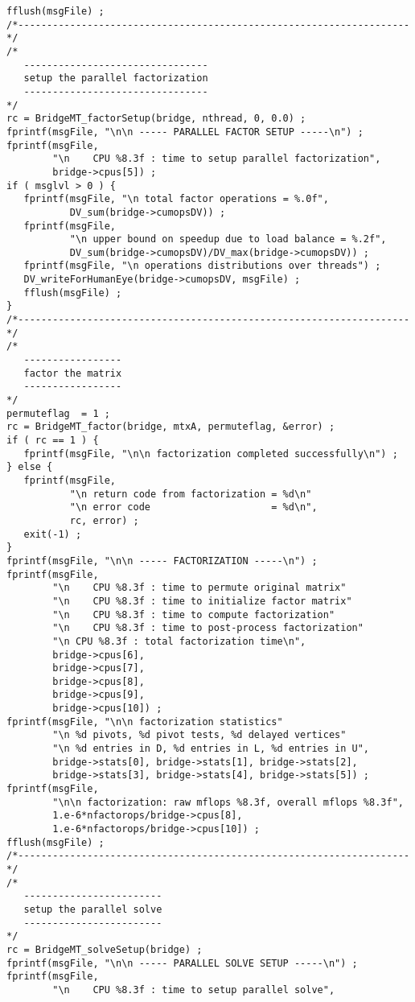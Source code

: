 \begin{verbatim}
fflush(msgFile) ;
/*--------------------------------------------------------------------*/
/*
   --------------------------------
   setup the parallel factorization
   --------------------------------
*/
rc = BridgeMT_factorSetup(bridge, nthread, 0, 0.0) ;
fprintf(msgFile, "\n\n ----- PARALLEL FACTOR SETUP -----\n") ;
fprintf(msgFile, 
        "\n    CPU %8.3f : time to setup parallel factorization",
        bridge->cpus[5]) ;
if ( msglvl > 0 ) {
   fprintf(msgFile, "\n total factor operations = %.0f",
           DV_sum(bridge->cumopsDV)) ;
   fprintf(msgFile, 
           "\n upper bound on speedup due to load balance = %.2f",
           DV_sum(bridge->cumopsDV)/DV_max(bridge->cumopsDV)) ;
   fprintf(msgFile, "\n operations distributions over threads") ;
   DV_writeForHumanEye(bridge->cumopsDV, msgFile) ;
   fflush(msgFile) ;
}
/*--------------------------------------------------------------------*/
/*
   -----------------
   factor the matrix
   -----------------
*/
permuteflag  = 1 ;
rc = BridgeMT_factor(bridge, mtxA, permuteflag, &error) ;
if ( rc == 1 ) {
   fprintf(msgFile, "\n\n factorization completed successfully\n") ;
} else {
   fprintf(msgFile, 
           "\n return code from factorization = %d\n"
           "\n error code                     = %d\n",
           rc, error) ;
   exit(-1) ;
}
fprintf(msgFile, "\n\n ----- FACTORIZATION -----\n") ;
fprintf(msgFile, 
        "\n    CPU %8.3f : time to permute original matrix"
        "\n    CPU %8.3f : time to initialize factor matrix" 
        "\n    CPU %8.3f : time to compute factorization"
        "\n    CPU %8.3f : time to post-process factorization"
        "\n CPU %8.3f : total factorization time\n",
        bridge->cpus[6],
        bridge->cpus[7],
        bridge->cpus[8],
        bridge->cpus[9],
        bridge->cpus[10]) ;
fprintf(msgFile, "\n\n factorization statistics"
        "\n %d pivots, %d pivot tests, %d delayed vertices"
        "\n %d entries in D, %d entries in L, %d entries in U",
        bridge->stats[0], bridge->stats[1], bridge->stats[2], 
        bridge->stats[3], bridge->stats[4], bridge->stats[5]) ;
fprintf(msgFile, 
        "\n\n factorization: raw mflops %8.3f, overall mflops %8.3f",
        1.e-6*nfactorops/bridge->cpus[8],
        1.e-6*nfactorops/bridge->cpus[10]) ;
fflush(msgFile) ;
/*--------------------------------------------------------------------*/
/*
   ------------------------
   setup the parallel solve
   ------------------------
*/
rc = BridgeMT_solveSetup(bridge) ;
fprintf(msgFile, "\n\n ----- PARALLEL SOLVE SETUP -----\n") ;
fprintf(msgFile, 
        "\n    CPU %8.3f : time to setup parallel solve",

\end{verbatim}
